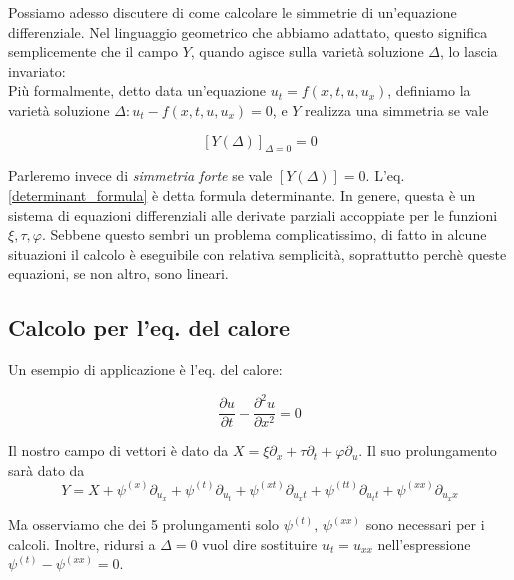 \documentclass{report}
\begin{document}
Possiamo adesso discutere di come calcolare le simmetrie di un'equazione differenziale. Nel linguaggio geometrico che abbiamo adattato, questo significa semplicemente che il campo $Y$, quando agisce sulla varietà soluzione $\Delta$, lo lascia invariato: \\

Più formalmente, detto data un'equazione $u_t = f(x, t, u, u _x)$, definiamo la varietà soluzione $\Delta : u_t - f(x, t, u, u_x) = 0$, e $Y$ realizza una simmetria se vale 

\begin{tcolorbox}[colback=doc!10, colframe=black, boxrule=1pt]
\begin{equation}
    \label{determinant_formula}
    \left[Y(\Delta) \right]_{\Delta=0} = 0 
\end{equation}
\end{tcolorbox}

Parleremo invece di \emph{simmetria forte} se vale $\left[Y(\Delta) \right] = 0 $. L'eq. \ref{determinant_formula} è detta formula determinante. In genere, questa è un sistema di equazioni differenziali alle derivate parziali accoppiate per le funzioni $\xi, \tau, \varphi$. Sebbene questo sembri un problema complicatissimo, di fatto in alcune situazioni il calcolo è eseguibile con relativa semplicità, soprattutto perchè queste equazioni, se non altro, sono lineari. \\


\subsection{Calcolo per l'eq. del calore}

Un esempio di applicazione è l'eq. del calore: 

\begin{equation}
    \frac{\partial u}{\partial t} - \frac{\partial ^2u}{\partial x^2} = 0
\end{equation}

Il nostro campo di vettori è dato da $X = \xi\partial_x + \tau\partial_t + \varphi\partial_u$. Il suo prolungamento sarà dato da 
\begin{equation}
    Y = X + \psi^{(x)}\partial_{u_x} + \psi^{(t)}\partial_{u_t} + \psi^{(xt)}\partial_{u_xt} + \psi^{(tt)}\partial_{u_tt} + \psi^{(xx)}\partial_{u_xx}
\end{equation}

Ma osserviamo che dei 5 prolungamenti solo $\psi^{(t)}, \, \psi^{(xx)}$ sono necessari per i calcoli. Inoltre, ridursi a $\Delta =0$ vuol dire sostituire $u_t = u_{xx}$ nell'espressione $\psi^{(t)} - \psi^{(xx)} =0$. \\
\end{document}

